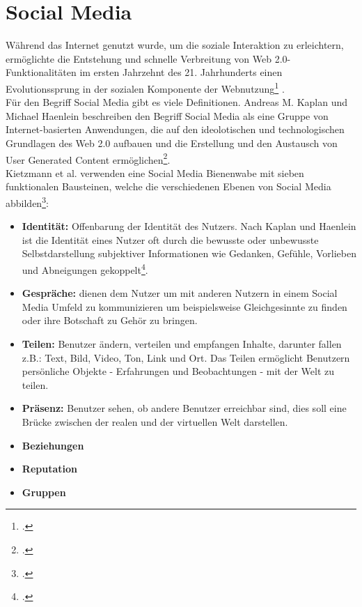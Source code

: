 \section{Social Media}
\label{sozialMedia}

Während das Internet genutzt wurde, um die soziale Interaktion zu erleichtern, ermöglichte die Entstehung und schnelle Verbreitung von Web 2.0-Funktionalitäten im ersten Jahrzehnt des 21. Jahrhunderts einen Evolutionssprung in der sozialen Komponente der Webnutzung\footcite[S. 745-750]{obarSocialMedia} .\\
Für den Begriff Social Media gibt es viele Definitionen. Andreas M. Kaplan und Michael Haenlein beschreiben den Begriff Social Media als eine Gruppe von Internet-basierten Anwendungen, die auf den ideolotischen und technologischen Grundlagen des Web 2.0 aufbauen und die Erstellung und den Austausch von User Generated Content ermöglichen\footcite[S. 59-68]{kaplan}.\\
Kietzmann et al. verwenden eine Social Media Bienenwabe mit sieben funktionalen Bausteinen, welche die verschiedenen Ebenen von Social Media abbilden\footcite[S.241-251]{kietzmann}:

\begin{itemize}
	\item \textbf{Identität:} Offenbarung der Identität des Nutzers. Nach Kaplan und Haenlein ist die Identität eines Nutzer oft durch die bewusste oder unbewusste Selbstdarstellung subjektiver Informationen wie Gedanken, Gefühle, Vorlieben und Abneigungen gekoppelt\footcite[S.59-68]{kaplan}.
	
	\item \textbf{Gespräche:} dienen dem Nutzer um mit anderen Nutzern in einem Social Media Umfeld zu kommunizieren um beispielsweise Gleichgesinnte zu finden oder ihre Botschaft zu Gehör zu bringen.
	
	\item \textbf{Teilen:} Benutzer ändern, verteilen und empfangen Inhalte, darunter fallen z.B.: Text, Bild, Video, Ton, Link und Ort. Das Teilen ermöglicht Benutzern persönliche Objekte - Erfahrungen und Beobachtungen - mit der Welt zu teilen.
	
	
	\item \textbf{Präsenz:} Benutzer sehen, ob andere Benutzer erreichbar sind, dies soll eine Brücke zwischen der realen und der virtuellen Welt darstellen.
	
	
	\item \textbf{Beziehungen}
	
	
	\item \textbf{Reputation}
	
	
	\item \textbf{Gruppen}
\end{itemize}
















